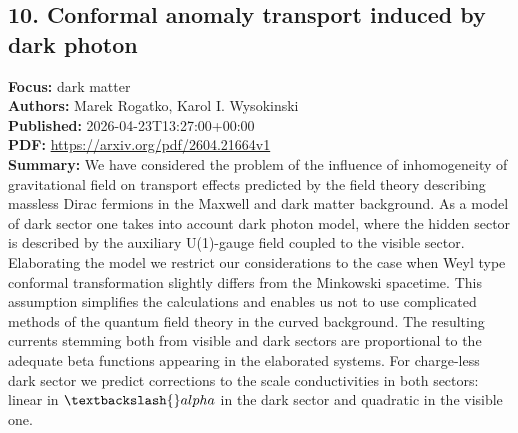 \documentclass[11pt]{article}
\begin{document}
\subsection*{10. Conformal anomaly transport induced by dark photon}
\textbf{Focus:} dark matter\\
\textbf{Authors:} Marek Rogatko, Karol I. Wysokinski\\
\textbf{Published:} 2026-04-23T13:27:00+00:00\\
\textbf{PDF:} \href{https://arxiv.org/pdf/2604.21664v1}{https://arxiv.org/pdf/2604.21664v1}\\
\textbf{Summary:}
We have considered the problem of the influence of inhomogeneity of gravitational field on transport effects predicted by the field theory describing massless Dirac fermions in the Maxwell and dark matter background. As a model of dark sector one takes into account dark photon model, where the hidden sector is described by the auxiliary U(1)-gauge field coupled to the visible sector. Elaborating the model we restrict our considerations to the case when Weyl type conformal transformation slightly differs from the Minkowski spacetime. This assumption simplifies the calculations and enables us not to use complicated methods of the quantum field theory in the curved background. The resulting currents stemming both from visible and dark sectors are proportional to the adequate beta functions appearing in the elaborated systems. For charge-less dark sector we predict corrections to the scale conductivities in both sectors: linear in $\textbackslash{}alpha$ in the dark sector and quadratic in the visible one.
\newpage
\end{document}
